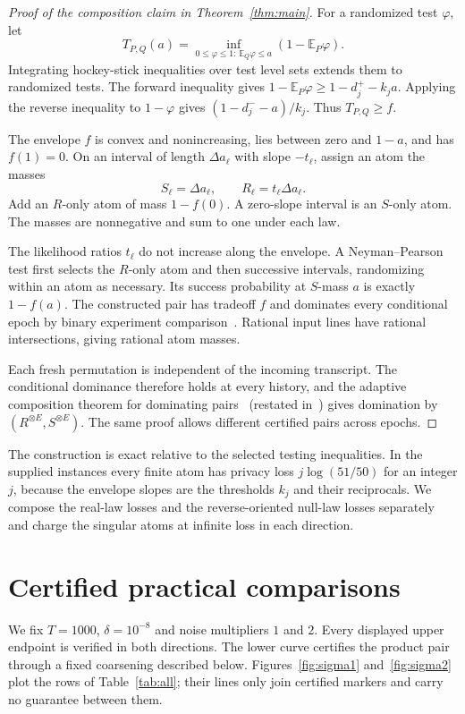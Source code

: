 \documentclass[conference]{IEEEtran}
\newcommand{\E}{\mathbb E}
\begin{document}
\begin{proof}[Proof of the composition claim in Theorem~\ref{thm:main}]
For a randomized test $\varphi$, let
\[
 T_{P,Q}(a)=\inf_{0\le\varphi\le1:\,\E_Q\varphi\le a}
 (1-\E_P\varphi).
\]
Integrating hockey-stick inequalities over test level sets extends them to randomized tests. The forward inequality gives $1-\E_P\varphi\ge1-d_j^+-k_ja$. Applying the reverse inequality to $1-\varphi$ gives $(1-d_j^- -a)/k_j$. Thus $T_{P,Q}\ge f$.

The envelope $f$ is convex and nonincreasing, lies between zero and $1-a$, and has $f(1)=0$. On an interval of length $\Delta a_\ell$ with slope $-t_\ell$, assign an atom the masses
\begin{equation}\label{eq:atoms}
 S_\ell=\Delta a_\ell,\qquad R_\ell=t_\ell\Delta a_\ell.
\end{equation}
Add an $R$-only atom of mass $1-f(0)$. A zero-slope interval is an $S$-only atom. The masses are nonnegative and sum to one under each law.

The likelihood ratios $t_\ell$ do not increase along the envelope. A Neyman--Pearson test first selects the $R$-only atom and then successive intervals, randomizing within an atom as necessary. Its success probability at $S$-mass $a$ is exactly $1-f(a)$. The constructed pair has tradeoff $f$ and dominates every conditional epoch by binary experiment comparison~\cite{gdp,zhu,dots}. Rational input lines have rational intersections, giving rational atom masses.

Each fresh permutation is independent of the incoming transcript. The conditional dominance therefore holds at every history, and the adaptive composition theorem for dominating pairs~\cite[Thm.~10]{zhu} (restated in~\cite[Thm.~2.4]{dots}) gives domination by $(R^{\otimes E},S^{\otimes E})$. The same proof allows different certified pairs across epochs.
\end{proof}

The construction is exact relative to the selected testing inequalities. In the supplied instances every finite atom has privacy loss $j\log(51/50)$ for an integer $j$, because the envelope slopes are the thresholds $k_j$ and their reciprocals. We compose the real-law losses and the reverse-oriented null-law losses separately and charge the singular atoms at infinite loss in each direction.

\section{Certified practical comparisons}\label{sec:evaluation}
We fix $T=1000$, $\delta=10^{-8}$ and noise multipliers $1$ and $2$. Every displayed upper endpoint is verified in both directions. The lower curve certifies the product pair through a fixed coarsening described below. Figures~\ref{fig:sigma1} and~\ref{fig:sigma2} plot the rows of Table~\ref{tab:all}; their lines only join certified markers and carry no guarantee between them.
\end{document}
